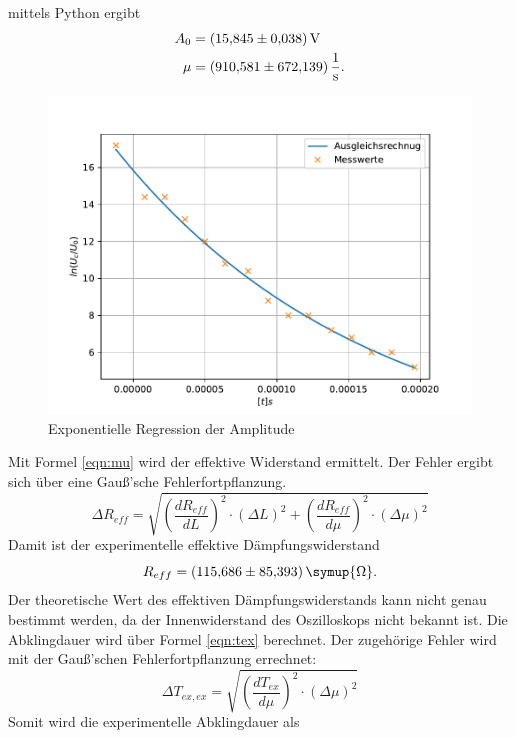 mittels Python ergibt
\begin{align*}
  A_{0} &= \SI{ 15.845 \pm 0.038}{V} \\
    \mu &= \SI{910.581 \pm 672.139}{\frac{1}{s}}.
\end{align*}
\begin{figure}[h!]
  \centering
  \includegraphics[width=\textwidth]{ampfit.pdf}
  \caption{Exponentielle Regression der Amplitude}
  \label{fig:ampfit}
\end{figure}
\FloatBarrier
Mit Formel \eqref{eqn:mu} wird der effektive Widerstand ermittelt.
Der Fehler ergibt sich über eine Gauß'sche Fehlerfortpflanzung.
\begin{equation*}
  \Delta R_{eff} = \sqrt{ \left( \frac{d R_{eff}}{dL} \right)^2 \cdot (\Delta L)^2 + \left( \frac{d R_{eff}}{d \mu} \right)^2 \cdot (\Delta \mu)^2 }
\end{equation*}
Damit ist der experimentelle effektive Dämpfungswiderstand
\begin{equation*}
  R_{eff}= \SI{115.686 \pm 85.393}{\symup{\Omega}}.
\end{equation*}
Der theoretische Wert des effektiven Dämpfungswiderstands kann nicht genau bestimmt werden, da der Innenwiderstand des Oszilloskops nicht bekannt ist.
Die Abklingdauer wird über Formel \eqref{eqn:tex} berechnet.
Der zugehörige Fehler wird mit der Gauß'schen Fehlerfortpflanzung errechnet:
\begin{equation*}
  \Delta T_{ex, ex} = \sqrt{ \left( \frac{d T_{ex}}{d \mu} \right)^2 \cdot (\Delta \mu)^2 }
\end{equation*}
Somit wird die experimentelle Abklingdauer als
